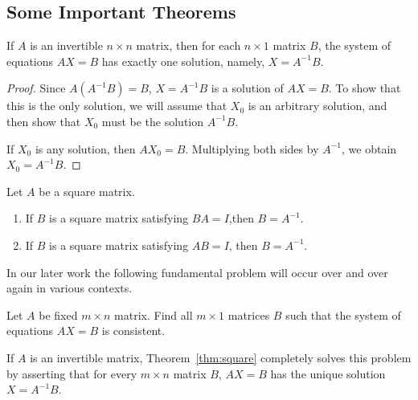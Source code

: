 \subsection{Some Important Theorems}

\begin{theorem}
If $A$ is an invertible $n\times n$ matrix, then for each $n\times 1$
matrix $B$, the system of equations $AX=B$ has exactly one solution,
namely, $X=A^{-1}B$.
\end{theorem}

\begin{proof}
Since $A(A^{-1}B) = B$, $X=A^{-1}B$ is a solution of $AX=B$.  To show
that this is the only solution, we will assume that $X_0$ is an
arbitrary solution, and then show that $X_0$ must be the solution
$A^{-1}B$.

If $X_0$ is any solution, then $AX_0=B$.  Multiplying both sides by
$A^{-1}$, we obtain $X_0=A^{-1}B$.
\end{proof}

\begin{theorem}
Let $A$ be a square matrix.
\begin{enumerate}
\item
 If $B$ is a square matrix satisfying $BA=I$,then $B=A^{-1}$.
\item
If $B$ is a square matrix satisfying $AB=I$, then $B=A^{-1}$.
\end{enumerate}
\label{thm:square}  %
\end{theorem}

In our later work the following fundamental problem will occur over and
over again in various contexts.


Let $A$ be fixed $m\times n$ matrix.  Find all $m\times 1$ matrices $B$
such that the system of equations $AX=B$ is consistent.

If $A$ is an invertible matrix, Theorem~\ref{thm:square} completely
solves this problem by asserting that for every $m\times n$ matrix $B$,
$AX=B$ has the unique solution $X=A^{-1}B$.

